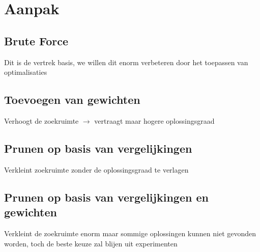 \documentclass[Main.tex]{subfiles}
\begin{document}
\section{Aanpak}
\subsection{Brute Force}
Dit is de vertrek basis, we willen dit enorm verbeteren door het toepassen van optimalisaties
\subsection{Toevoegen van gewichten}
Verhoogt de zoekruimte $\rightarrow$ vertraagt maar hogere oplossingsgraad
\subsection{Prunen op basis van vergelijkingen}
Verkleint zoekruimte zonder de oplossingsgraad te verlagen
\subsection{Prunen op basis van vergelijkingen en gewichten}
Verkleint de zoekruimte enorm maar sommige oplossingen kunnen niet gevonden worden, toch de beste keuze zal blijen uit experimenten
\end{document}
